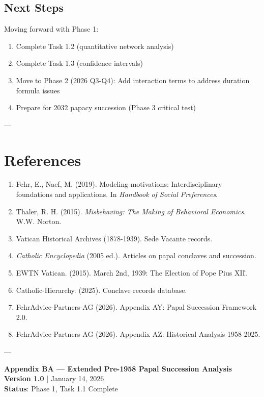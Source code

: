 \documentclass[11pt,a4paper]{article}
\begin{document}
\subsection{Next Steps}

Moving forward with Phase 1:
\begin{enumerate}
    \item Complete Task 1.2 (quantitative network analysis)
    \item Complete Task 1.3 (confidence intervals)
    \item Move to Phase 2 (2026 Q3-Q4): Add interaction terms to address duration formula issues
    \item Prepare for 2032 papacy succession (Phase 3 critical test)
\end{enumerate}

---

\section{References}

\small

\begin{enumerate}
    \item Fehr, E., Naef, M. (2019). Modeling motivations: Interdisciplinary foundations and applications. In \textit{Handbook of Social Preferences}.
    \item Thaler, R. H. (2015). \textit{Misbehaving: The Making of Behavioral Economics}. W.W. Norton.
    \item Vatican Historical Archives (1878-1939). Sede Vacante records.
    \item \textit{Catholic Encyclopedia} (2005 ed.). Articles on papal conclaves and succession.
    \item EWTN Vatican. (2015). \"March 2nd, 1939: The Election of Pope Pius XII.\"
    \item Catholic-Hierarchy. (2025). Conclave records database.
    \item FehrAdvice-Partners-AG (2026). Appendix AY: Papal Succession Framework 2.0.
    \item FehrAdvice-Partners-AG (2026). Appendix AZ: Historical Analysis 1958-2025.
\end{enumerate}

---

\textbf{Appendix BA --- Extended Pre-1958 Papal Succession Analysis}\\
\textbf{Version 1.0} | January 14, 2026\\
\textbf{Status}: Phase 1, Task 1.1 Complete
\end{document}
